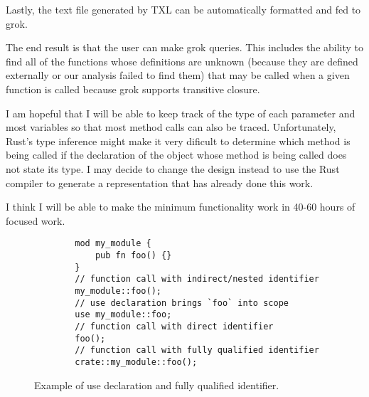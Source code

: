 \documentclass[11pt]{article}
\begin{document}
Lastly, the text file generated by TXL can be automatically formatted and fed to grok.

The end result is that the user can make grok queries.
This includes the ability to find all of the functions whose definitions are unknown (because they are defined externally or our analysis failed to find them) that may be called when a given function is called because grok supports transitive closure.

I am hopeful that I will be able to keep track of the type of each parameter and most variables so that most method calls can also be traced.
Unfortunately, Rust's type inference might make it very dificult to determine which method is being called if the declaration of the object whose method is being called does not state its type.
I may decide to change the design instead to use the Rust compiler to generate a representation that has already done this work.



I think I will be able to make the minimum functionality work in 40-60 hours of focused work.





\begin{figure}
    \caption{Example of use declaration and fully qualified identifier.}
    \label{fig:qualifiers}
    \begin{lstlisting}
        mod my_module {
            pub fn foo() {}
        }
        // function call with indirect/nested identifier
        my_module::foo();
        // use declaration brings `foo` into scope
        use my_module::foo;
        // function call with direct identifier
        foo();
        // function call with fully qualified identifier
        crate::my_module::foo();
    \end{lstlisting}
\end{figure}
\end{document}
